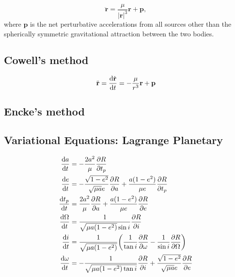 \begin{equation}
    \ddot{\mathbf{r}}=\frac{\mu}{|\mathbf{r}|^3}\mathbf{r}+\mathbf{p},
    \label{eq:newtons_equation_planetary_with_p}
\end{equation}
where $\mathbf{p}$ is the net perturbative accelerations from all sources other than the spherically symmetric gravitational attraction between the two bodies.

\subsection{Cowell's method}

\begin{equation}
    \begin{aligned}
        \ddot{\mathbf{r}}=\dv{\dot{\mathbf{r}}}{t}=-\frac{\mu}{r^3}\mathbf{r} + \mathbf{p}
    \end{aligned}
\end{equation}

\subsection{Encke's method}

\subsection{Variational Equations: Lagrange Planetary}

\begin{equation}
    \begin{aligned}
        \dv{a}{t}&=-\frac{2a^2}{\mu}\pdv{R}{t_p}\\
        \dv{e}{t}&=-\frac{\sqrt{1-e^2}}{\sqrt{\mu{a}}e}\pdv{R}{a} + \frac{a(1-e^2)}{\mu{e}} \pdv{R}{t_p}\\
        \dv{t_p}{t}&=\frac{2a^2}{\mu}\pdv{R}{a}+\frac{a(1-e^2)}{\mu{e}}\pdv{R}{e}\\
        \dv{\Omega}{t}&=\frac{1}{\sqrt{\mu{a}(1-e^2)}\sin{i}}\pdv{R}{i}\\
        \dv{i}{t}&=\frac{1}{\sqrt{\mu{a(1-e^2)}}}\bigg(\frac{1}{\tan{i}}\pdv{R}{\omega}-\frac{1}{\sin{i}}\pdv{R}{\Omega}\bigg)\\
        \dv{\omega}{t}&=-\frac{1}{\sqrt{\mu{a}(1-e^2)\tan{i}}}\pdv{R}{i}+\frac{\sqrt{1-e^2}}{\sqrt{\mu{a}}e}\pdv{R}{e}
    \end{aligned}
\end{equation}

